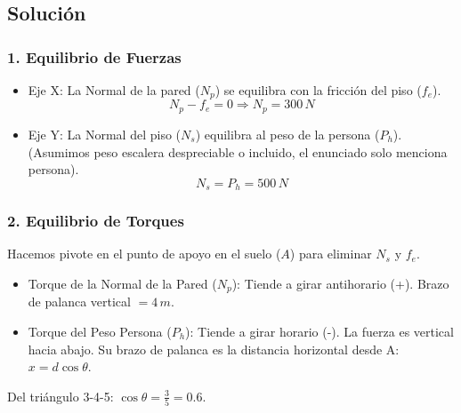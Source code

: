 \documentclass[12pt, a4paper]{article}
\begin{document}
\begin{center}
\end{center}

\subsection*{Solución}

\subsubsection*{1. Equilibrio de Fuerzas}
\begin{itemize}
    \item Eje X: La Normal de la pared ($N_p$) se equilibra con la fricción del piso ($f_e$).
    $$ N_p - f_e = 0 \Rightarrow N_p = 300 \, \si{N} $$
    \item Eje Y: La Normal del piso ($N_s$) equilibra al peso de la persona ($P_h$). (Asumimos peso escalera despreciable o incluido, el enunciado solo menciona persona).
    $$ N_s = P_h = 500 \, \si{N} $$
\end{itemize}

\subsubsection*{2. Equilibrio de Torques}
Hacemos pivote en el punto de apoyo en el suelo ($A$) para eliminar $N_s$ y $f_e$.
\begin{itemize}
    \item Torque de la Normal de la Pared ($N_p$): Tiende a girar antihorario (+). Brazo de palanca vertical $= 4 \, \si{m}$.
    \item Torque del Peso Persona ($P_h$): Tiende a girar horario (-). La fuerza es vertical hacia abajo. Su brazo de palanca es la distancia horizontal desde A: $x = d \cos \theta$.
\end{itemize}
Del triángulo 3-4-5: $\cos \theta = \frac{3}{5} = 0.6$.
\end{document}
